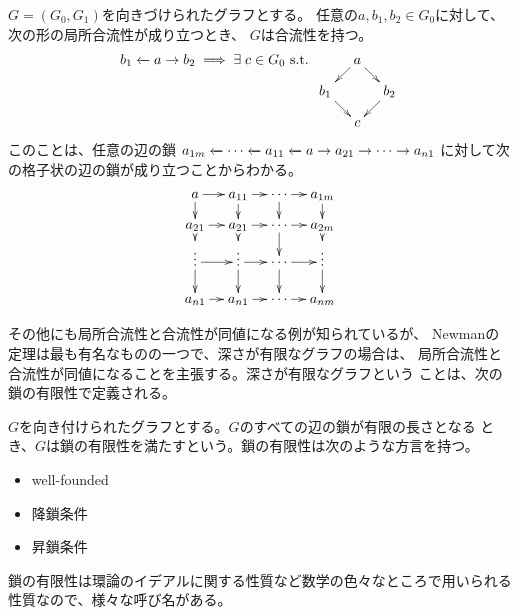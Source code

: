 {	\begin{example}[合流性を持つ例]\label{eg:合流性を持つ例} %
		$G=(G_0,G_1)$を向きづけられたグラフとする。
		任意の$a,b_1,b_2\in G_0$に対して、次の形の局所合流性が成り立つとき、
		$G$は合流性を持つ。
		\begin{equation*}\begin{split}
			b_1\from a\to b_2 \implies \exists\; c\in G_0 \text{ s.t. }
			\xymatrix@R=1em@C=1em{
				& a \ar[dl] \ar[dr] \\
				b_1 \ar[dr] & & b_2 \ar[dl] \\
				& c
			}
		\end{split}\end{equation*}
		このことは、任意の辺の鎖
		$a_{1m}\xleftarrow[{}]{}\cdots\xleftarrow[{}]{} a_{11}\xleftarrow[{}]{} a\to a_{21}\to\cdots\to a_{n1}$
		に対して次の格子状の辺の鎖が成り立つことからわかる。
		\begin{equation*}\xymatrix@R=1em@C=1em{
			a \ar[r] \ar[d] & a_{11} \ar[r] \ar[d] & \cdots \ar[r] \ar[d] 
				& a_{1m} \ar[d] \\
			a_{21} \ar[r] \ar[d] & a_{21} \ar[r] \ar[d] & \cdots \ar[r] \ar[d] 
				& a_{2m} \ar[d] \\
			\vdots \ar[r] \ar[d] & \vdots \ar[r] \ar[d] & \cdots \ar[r] \ar[d] 
				& \vdots \ar[d] \\
			a_{n1} \ar[r] & a_{n1} \ar[r] & \cdots \ar[r] & a_{nm} \\
		}\end{equation*}
	\end{example} %

	その他にも局所合流性と合流性が同値になる例が知られているが、
	Newmanの定理は最も有名なものの一つで、深さが有限なグラフの場合は、
	局所合流性と合流性が同値になることを主張する。深さが有限なグラフという
	ことは、次の鎖の有限性で定義される。

	\begin{definition}[鎖の有限性]\label{def:鎖の有限性} %
		$G$を向き付けられたグラフとする。$G$のすべての辺の鎖が有限の長さとなる
		とき、$G$は鎖の有限性を満たすという。鎖の有限性は次のような方言を持つ。
		\begin{itemize}\setlength{\itemsep}{-1mm} %
			\item well-founded
			\item 降鎖条件
			\item 昇鎖条件
		\end{itemize} %
	\end{definition} %

	鎖の有限性は環論のイデアルに関する性質など数学の色々なところで用いられる
	性質なので、様々な呼び名がある。

}
